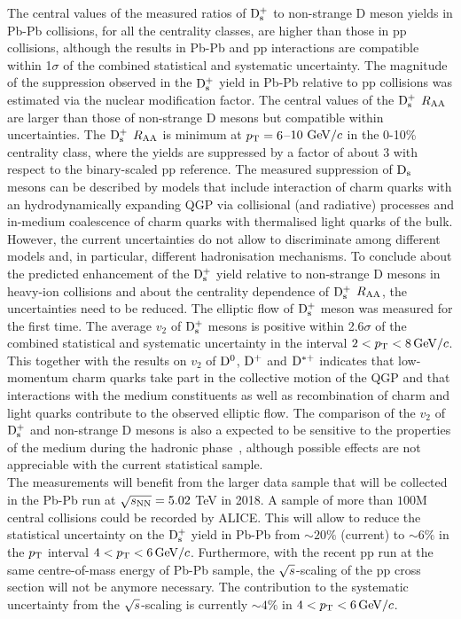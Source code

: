The central values of the measured ratios of ${\rm D_s^+}$ to non-strange D meson yields in Pb-Pb collisions,
for all the centrality classes, are higher than those in pp collisions, although the results in Pb-Pb and pp interactions are compatible
within 1$\sigma$ of the combined statistical and systematic uncertainty.
The magnitude of the suppression observed in the ${\rm D_s^+}$ yield in Pb-Pb  
relative to pp collisions was estimated via the nuclear modification factor.
The central values of the ${\rm D_s^+}$ $R_{\rm AA}$ are larger than those of 
non-strange D mesons but compatible within uncertainties. The ${\rm D_s^+}$ $R_{\rm AA}$ is minimum
at $p_{\rm T}=6$--$10~\mathrm{GeV}/c$ in the 0-10\% centrality class, 
where the yields are suppressed by a factor of about 3 with respect to the binary-scaled pp reference.
The measured suppression of ${\rm D_s}$ mesons
can be described by models that include interaction of charm quarks with an hydrodynamically expanding QGP 
via collisional (and radiative) processes and in-medium coalescence of charm quarks
with thermalised light quarks of the bulk. However, the current uncertainties do not allow
to discriminate among different models and, in particular, different hadronisation mechanisms. To conclude about the 
predicted enhancement of the ${\rm D_s^+}$ yield relative to non-strange D mesons in 
heavy-ion collisions and about the centrality dependence of ${\rm D_s^+}$ $R_{\rm AA}$, the 
uncertainties need to be reduced.
The elliptic flow of ${\rm D_s^+}$ meson was measured for the first time. The
 average $v_2$ of ${\rm D_s^+}$ mesons is positive within 2.6$\sigma$ of the combined statistical and systematic 
 uncertainty in the interval $2 < p_{\rm T} <8 \, \mathrm{GeV}/c$. This together with the results on $v_2$ of ${\rm D^0}$, ${\rm D^+}$ and
 ${\rm D^{*+}}$ indicates that low-momentum charm quarks take part in the
collective motion of the QGP and that interactions with the medium constituents as well as recombination of charm
and light quarks contribute to the observed elliptic flow. The comparison of the $v_2$ of ${\rm D_s^+}$ and
 non-strange D mesons is also a expected to be sensitive to the properties of the medium during the hadronic phase~\cite{He:2014cla},
 although possible effects are not appreciable with the current statistical sample.\\
 
 
 The measurements will benefit from the larger data sample that will be collected in the Pb-Pb run at 
 $\sqrt{s_{\rm NN}}=5.02$ TeV in 2018. A sample of more than $100$M central
 collisions could be recorded by ALICE. This will allow to reduce the statistical uncertainty
 on the ${\rm D_s^+}$ yield in Pb-Pb from $\sim 20\%$ (current) to $\sim 6\%$ in the 
 $p_{\rm T}$ interval $4 < p_{\rm T} < 6 \, \mathrm{GeV}/c$. Furthermore, with the recent pp run at the same centre-of-mass energy
 of Pb-Pb sample, the $\sqrt{s}$-scaling of the pp cross section will not be anymore necessary. 
 The contribution to the systematic uncertainty from the $\sqrt{s}$-scaling is currently $\sim4\%$ in $4 < p_{\rm T} < 6 \, \mathrm{GeV}/c$.\\
 
